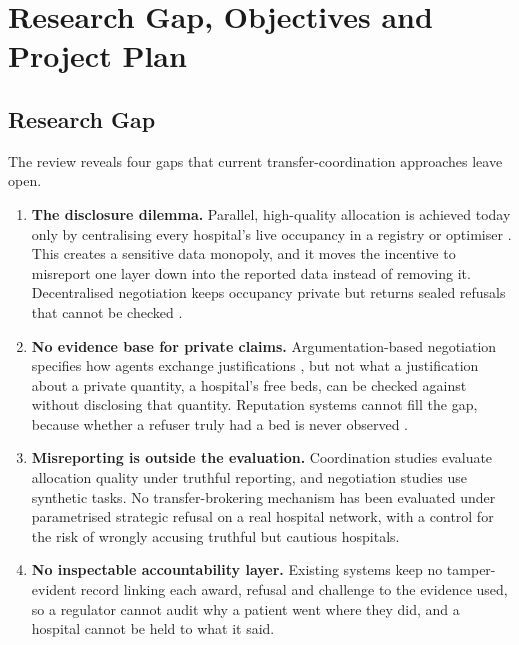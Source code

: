 \section{Research Gap, Objectives and Project Plan}
\label{sec:goals}

\subsection{Research Gap}
\label{sec:gap}
The review reveals four gaps that current transfer-coordination approaches leave open.
\begin{enumerate}
\setlength{\itemsep}{2pt}
\item \textbf{The disclosure dilemma.} Parallel, high-quality allocation is achieved today only by centralising every hospital's live occupancy in a registry or optimiser \cite{villarroel2023surgeline,dijkstra2023balancing,parker2020redistribution}. This creates a sensitive data monopoly, and it moves the incentive to misreport one layer down into the reported data instead of removing it. Decentralised negotiation keeps occupancy private but returns sealed refusals that cannot be checked \cite{smith1980contract}.
\item \textbf{No evidence base for private claims.} Argumentation-based negotiation specifies how agents exchange justifications \cite{rahwan2003abn,amgoud2007unified}, but not what a justification about a private quantity, a hospital's free beds, can be checked against without disclosing that quantity. Reputation systems cannot fill the gap, because whether a refuser truly had a bed is never observed \cite{ramchurn2004trust}.
\item \textbf{Misreporting is outside the evaluation.} Coordination studies evaluate allocation quality under truthful reporting, and negotiation studies use synthetic tasks. No transfer-brokering mechanism has been evaluated under parametrised strategic refusal on a real hospital network, with a control for the risk of wrongly accusing truthful but cautious hospitals.
\item \textbf{No inspectable accountability layer.} Existing systems keep no tamper-evident record linking each award, refusal and challenge to the evidence used, so a regulator cannot audit why a patient went where they did, and a hospital cannot be held to what it said.
\end{enumerate}

